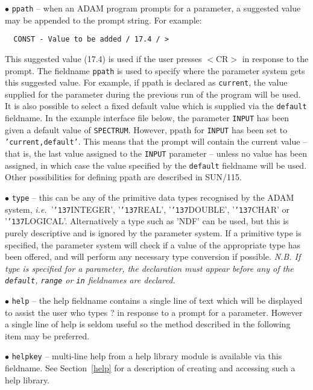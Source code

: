 \documentclass[twoside,11pt]{article}
\renewcommand{\_}{{\tt\char'137}}
\newcommand{\xref}[3]{#1}
\begin{document}
\begin{description}
\item{$\bullet$ \tt ppath} --
when an ADAM program prompts for a parameter, a suggested value
may be appended to the prompt string. For example:
\begin{verbatim}
  CONST - Value to be added / 17.4 / >
\end{verbatim}
This suggested value (17.4) is used if the user presses
$<$CR$>$ in response to the prompt.
The fieldname {\tt ppath}
is used to specify where the parameter system gets this suggested value.
For example, if ppath is declared as {\tt current}, the value supplied for
the parameter during the
previous run of the program will be used.
It is also possible to select a  fixed default value which is supplied
via the {\tt default}  fieldname.
In the example interface file below, the parameter {\tt INPUT}
has been given a default value of {\tt SPECTRUM}.
However, ppath for {\tt INPUT} has been
set to {\tt 'current,default'}. This means that the prompt will contain the
current value -- that is, the last
value assigned to the {\tt INPUT} parameter -- unless no value has been assigned, in
which case the value specified by the {\tt default} fieldname will be used.
Other possibilities for defining ppath are described in
\xref{SUN/115}{sun115}{}.

\item{$\bullet$ \tt type} -- this can be any of the primitive data types
recognised by the ADAM system, {\it i.e.}\ '\_INTEGER', '\_REAL', '\_DOUBLE',
'\_CHAR' or '\_LOGICAL'.
Alternatively a type such as 'NDF' can be used, but this is purely
descriptive and is ignored by the parameter system.
If a primitive type is specified, the parameter system
will check if a value of the appropriate type has been offered, and will
perform any necessary type conversion if possible.
{\sl N.B. If type is specified for a parameter, the declaration  must appear
before any of the {\tt default}, {\tt range} or  {\tt in} fieldnames
are declared.}

\item{$\bullet$ \tt help} -- the help fieldname contains a single line
of text which will be displayed to assist the user who types ? in response to a
prompt for a parameter. However a single line of help is seldom useful so
the method described in the following item may be  preferred.

\item{$\bullet$ \tt helpkey} -- multi-line help from a help library
module is available via this
fieldname. See Section~\ref{help} for a description of creating and
accessing such a help
library.



\end{description}
\end{document}
